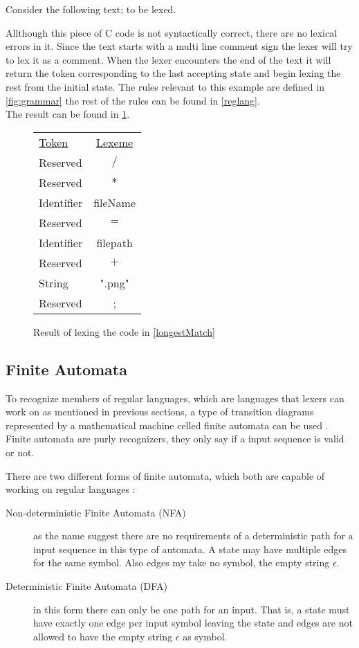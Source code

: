 \begin{example} \label{longestMatch}
Consider the following text; to be lexed.

Allthough this piece of C code is not syntactically correct, there are no
lexical errors in it. Since
the text starts with a multi line comment sign the lexer will try to lex it as
a comment. When the lexer encounters the end of the text it will return the
token corresponding to the last accepting state and begin lexing the rest from
the initial state. The rules relevant to this example are defined in 
\cref{fig:grammar} the rest of the rules can be found in \cref{reglang}.\\
The result can be found in \cref{fig:longestmatch}.
\end{example}

\begin{figure}[h!]
\begin{center}
\begin{tabular}{l c}
\underline{Token} & \underline{Lexeme}\\
Reserved & $/$\\
Reserved & $*$\\
Identifier &fileName\\
Reserved & $=$\\
Identifier & filepath\\
Reserved & $+$\\
String & ".png"\\
Reserved & ;
\end{tabular}
\end{center}
\caption{Result of lexing the code in \cref{longestMatch} \label{fig:longestmatch}}
\end{figure}


\subsection{Finite Automata}
To recognize members of regular languages, which are languages that lexers can
work on as mentioned in previous sections, a type of transition diagrams
represented by a mathematical machine celled finite automata can be used
\cite{sebesta2012}. Finite automata are purly recognizers, they only say if a
input sequence is valid or not.

There are two different forms of finite automata, which both are capable of
working on regular languages \cite{Aho2006}:
\begin{description}
\item [Non-deterministic Finite Automata (NFA)] as the name suggest there are no
requirements of a deterministic path for a input sequence in this type of
automata. A state may have multiple edges for the same symbol. Also edges my
take no symbol, the empty string $\epsilon$.
\item [Deterministic Finite Automata (DFA)] in this form there can only be one
path for an input. That is, a state must have exactly one edge per input symbol
leaving the state and edges are not allowed to have the empty string $\epsilon$
as symbol.
\end{description}

